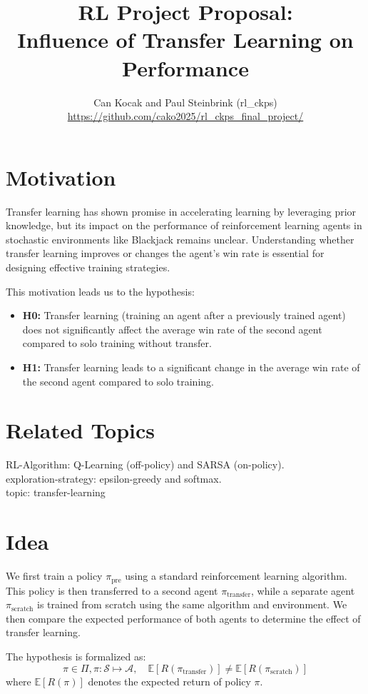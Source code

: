 \documentclass{article}
\title{{\large RL Project Proposal:}\\

Influence of Transfer Learning on Performance}
\author{Can Kocak and Paul Steinbrink (rl\_ckps) \\ \url{https://github.com/cako2025/rl_ckps_final_project/}}
\begin{document}
\maketitle
\section{Motivation}
Transfer learning has shown promise in accelerating learning by leveraging prior knowledge, but its impact on the performance of reinforcement learning agents in stochastic environments like Blackjack remains unclear. Understanding whether transfer learning improves or changes the agent's win rate is essential for designing effective training strategies.

This motivation leads us to the hypothesis:
\begin{itemize}
    \item \textbf{H0:} Transfer learning (training an agent after a previously trained agent) does not significantly affect the average win rate of the second agent compared to solo training without transfer.
    \item \textbf{H1:} Transfer learning leads to a significant change in the average win rate of the second agent compared to solo training.
\end{itemize}

\section{Related Topics}
RL-Algorithm: Q-Learning (off-policy) and SARSA (on-policy).\\
exploration-strategy: epsilon-greedy and softmax.\\
topic: transfer-learning

\section{Idea}
We first train a policy $\pi_{\text{pre}}$ using a standard reinforcement learning algorithm. 
This policy is then transferred to a second agent $\pi_{\text{transfer}}$, while a separate agent 
$\pi_{\text{scratch}}$ is trained from scratch using the same algorithm and environment. 
We then compare the expected performance of both agents to determine the effect of transfer learning.

The hypothesis is formalized as:
\begin{equation}
    \label{eq:hypothesis}
    \pi \in \Pi, \pi: \mathcal{S} \mapsto \mathcal{A}, \quad \mathbb{E}[R(\pi_{\text{transfer}})] \neq \mathbb{E}[R(\pi_{\text{scratch}})]
\end{equation}
where $\mathbb{E}[R(\pi)]$ denotes the expected return of policy $\pi$.
\end{document}
